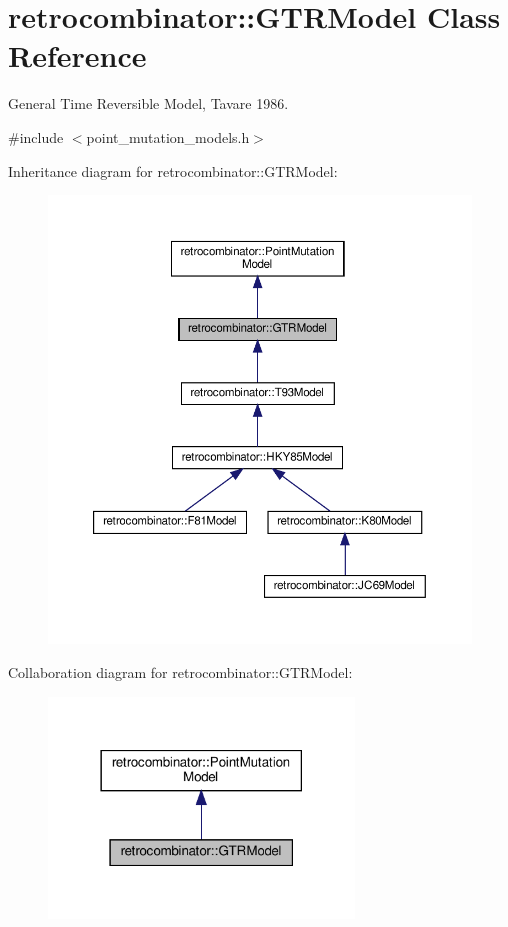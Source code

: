 \hypertarget{classretrocombinator_1_1GTRModel}{}\section{retrocombinator\+:\+:G\+T\+R\+Model Class Reference}
\label{classretrocombinator_1_1GTRModel}


General Time Reversible Model, Tavare 1986.  




{\ttfamily \#include $<$point\+\_\+mutation\+\_\+models.\+h$>$}



Inheritance diagram for retrocombinator\+:\+:G\+T\+R\+Model\+:\nopagebreak
\begin{figure}[H]
\begin{center}
\leavevmode
\includegraphics[width=350pt]{classretrocombinator_1_1GTRModel__inherit__graph}
\end{center}
\end{figure}


Collaboration diagram for retrocombinator\+:\+:G\+T\+R\+Model\+:\nopagebreak
\begin{figure}[H]
\begin{center}
\leavevmode
\includegraphics[width=230pt]{classretrocombinator_1_1GTRModel__coll__graph}
\end{center}
\end{figure}

